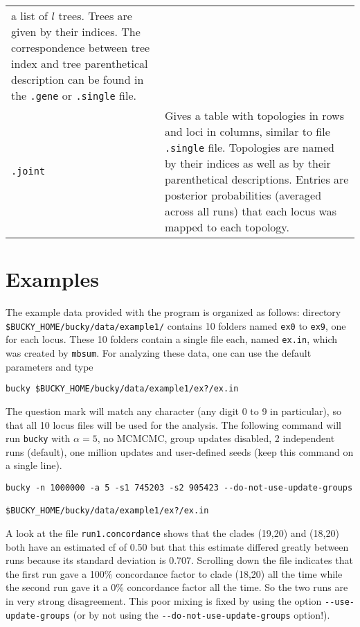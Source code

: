 \documentclass[12pt,english,final,letterpaper]{article}
\begin{document}
\begin{tabular}{l|p{5.1in}}
a list of $l$ trees. Trees are given by their indices. The correspondence
between tree index and tree parenthetical description can be found in the
{\tt .gene} or {\tt .single} file.\\
%
{\tt .joint}&Gives a table with topologies in rows and loci in columns,
similar to file {\tt .single} file. Topologies are 
named by their indices as well as by their parenthetical descriptions. 
Entries are posterior probabilities (averaged across all runs) 
that each locus was mapped to each topology.\\ 
\end{tabular}

\section{Examples}

The example data provided with the program is organized as follows:
directory\\ \verb+$BUCKY_HOME/bucky/data/example1/+ %
contains 10 folders named {\tt ex0} to {\tt ex9}, one for each locus. 
These 10 folders contain a single file each, named {\tt ex.in}, which was 
created by  {\tt mbsum}.
For analyzing these data, one
can use the default parameters and type
\begin{verbatim}
bucky $BUCKY_HOME/bucky/data/example1/ex?/ex.in
\end{verbatim}%
The question mark will match any character (any digit 0 to 9 in
particular), so that all 10 locus files will be used for the analysis.
The following command will run {\tt bucky} with 
$\alpha=5$, no MCMCMC, group updates disabled, 2 independent runs (default), 
one million updates and user-defined seeds (keep this command on a single line).

\begin{verbatim}
bucky -n 1000000 -a 5 -s1 745203 -s2 905423 --do-not-use-update-groups 
                                    $BUCKY_HOME/bucky/data/example1/ex?/ex.in
\end{verbatim}

A look at the file {\tt run1.concordance} shows that the clades (19,20) and
(18,20) both have an estimated {\sc cf} of 0.50 but that this estimate differed
greatly between runs because its standard deviation is 0.707. Scrolling down
the file indicates that the first run gave a 100\% concordance factor to clade
(18,20) all the time while the second run gave it a 0\% concordance factor 
all the time.
So the two runs are in very strong disagreement. 
This poor mixing is fixed by using the option
\verb+--use-update-groups+ (or by not using the 
\verb+--do-not-use-update-groups+ option!).
\medskip
\end{document}
